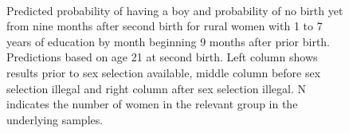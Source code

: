 \documentclass[12pt,letterpaper]{article}
\begin{document}
\begin{figure}[htpb]
{\begin{minipage}{0.31\textwidth}
        \captionsetup[subfigure]{labelformat=empty,position=top,captionskip=-1pt,farskip=-0.5pt}
        \\
        \captionsetup[subfigure]{labelformat=parens}
    \end{minipage}
}
\setcounter{subfigure}{3}
\caption{Predicted probability of having a boy and probability of
no birth yet from nine months after second birth for rural
women with 1 to 7 years of education by month beginning 9 months after prior birth. 
Predictions based on age 21 at second birth.
Left column shows results prior to sex selection available, middle column before
sex selection illegal and right column after sex selection illegal.
N indicates the number of women in the relevant group in the underlying samples.
}
\label{fig:results_spell4_med_rural}
\end{figure}
\end{document}
